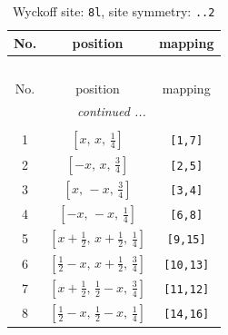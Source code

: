 \documentclass[fleqn,8pt]{jsarticle}
\begin{document}
\begin{longtable}{ccc}
\caption{Wyckoff site: {\tt 8l}, site symmetry: {\tt ..2}}
 \\
 \hline \hline
No. & position & mapping \\ \hline \endfirsthead

\multicolumn{2}{l}{\tablename\ \thetable{}} \\
 \hline \hline
No. & position & mapping \\ \hline \endhead

 \hline \hline
\multicolumn{2}{r}{\footnotesize\it continued ...} \\ \endfoot

 \hline \hline
\multicolumn{2}{r}{} \\ \endlastfoot

1 & $\left[ x,\, x,\, \frac{1}{4} \right]$ & {\tt [1,7]} \\ \hline
2 & $\left[ - x,\, x,\, \frac{3}{4} \right]$ & {\tt [2,5]} \\ \hline
3 & $\left[ x,\, - x,\, \frac{3}{4} \right]$ & {\tt [3,4]} \\ \hline
4 & $\left[ - x,\, - x,\, \frac{1}{4} \right]$ & {\tt [6,8]} \\ \hline
5 & $\left[ x + \frac{1}{2},\, x + \frac{1}{2},\, \frac{1}{4} \right]$ & {\tt [9,15]} \\ \hline
6 & $\left[ \frac{1}{2} - x,\, x + \frac{1}{2},\, \frac{3}{4} \right]$ & {\tt [10,13]} \\ \hline
7 & $\left[ x + \frac{1}{2},\, \frac{1}{2} - x,\, \frac{3}{4} \right]$ & {\tt [11,12]} \\ \hline
8 & $\left[ \frac{1}{2} - x,\, \frac{1}{2} - x,\, \frac{1}{4} \right]$ & {\tt [14,16]} \\
\end{longtable}
\renewcommand{\arraystretch}{1.2}
\end{document}
